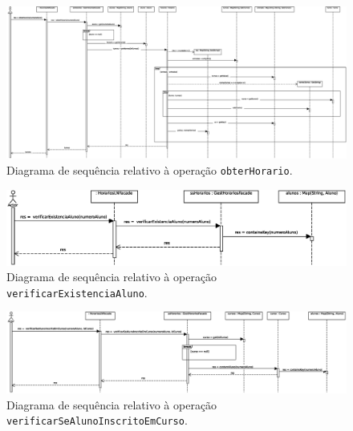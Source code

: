 \documentclass[12pt, a4paper]{article}
\begin{document}
\begin{landscape}
        \begin{figure}[H]
            \centering
            \includegraphics[scale=0.45]{Imagens/Modelos/obterHorario.svg.eps}
            \caption{
                Diagrama de sequência relativo à operação \texttt{obterHorario}.
            }
        \end{figure}

        \vspace*{\fill}
        \pagebreak
        \vspace*{\fill}

        \begin{figure}[H]
            \centering
            \includegraphics[scale=1.0]{Imagens/Modelos/verificarExistenciaAluno.svg.eps}
            \caption{
                Diagrama de sequência relativo à operação \texttt{verificarExistenciaAluno}.
            }
        \end{figure}

        \vspace*{\fill}
        \pagebreak
        \vspace*{\fill}

        \begin{figure}[H]
            \centering
            \includegraphics[scale=0.65]{Imagens/Modelos/verificarSeAlunoInscritoEmCurso.svg.eps}
            \caption{
                Diagrama de sequência relativo à operação \texttt{verificarSeAlunoInscritoEmCurso}.
            }
        \end{figure}


\end{landscape}
\end{document}
